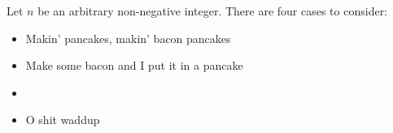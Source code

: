 \documentclass[11pt]{article}
\begin{document}



\begin{solution}
Let $n$ be an arbitrary non-negative integer. There are four cases to consider:
\begin{itemize}
\item
Makin’ pancakes, makin’ bacon pancakes

\item
Make some bacon and I put it in a pancake

\item
{}

\item
O shit waddup
\end{itemize}
\end{solution}
\end{document}
